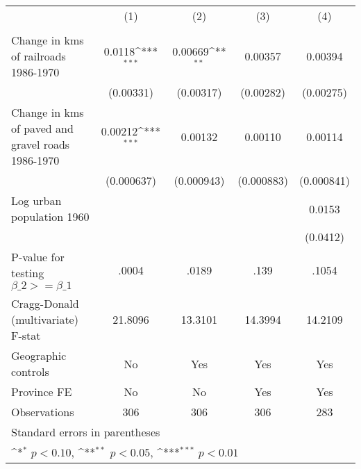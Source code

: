 {
\def\sym#1{\ifmmode^{#1}\else\(^{#1}\)\fi}
\begin{tabular}{l*{4}{c}}
\hline\hline
                &\multicolumn{1}{c}{(1)}&\multicolumn{1}{c}{(2)}&\multicolumn{1}{c}{(3)}&\multicolumn{1}{c}{(4)}\\
                &\multicolumn{1}{c}{}&\multicolumn{1}{c}{}&\multicolumn{1}{c}{}&\multicolumn{1}{c}{}\\
\hline
Change in kms of railroads 1986-1970&   0.0118\sym{***}&  0.00669\sym{**} &  0.00357         &  0.00394         \\
                &(0.00331)         &(0.00317)         &(0.00282)         &(0.00275)         \\
[1em]
Change in kms of paved and gravel roads 1986-1970&  0.00212\sym{***}&  0.00132         &  0.00110         &  0.00114         \\
                &(0.000637)         &(0.000943)         &(0.000883)         &(0.000841)         \\
[1em]
Log urban population 1960&                  &                  &                  &   0.0153         \\
                &                  &                  &                  & (0.0412)         \\
\hline
P-value for testing $\beta\_{2} >= \beta\_{1}$&    .0004         &    .0189         &     .139         &    .1054         \\
Cragg-Donald (multivariate) F-stat&  21.8096         &  13.3101         &  14.3994         &  14.2109         \\
Geographic controls&       No         &      Yes         &      Yes         &      Yes         \\
Province FE     &       No         &       No         &      Yes         &      Yes         \\
Observations    &      306         &      306         &      306         &      283         \\
\hline\hline
\multicolumn{5}{l}{\footnotesize Standard errors in parentheses}\\
\multicolumn{5}{l}{\footnotesize \sym{*} \(p<0.10\), \sym{**} \(p<0.05\), \sym{***} \(p<0.01\)}\\
\end{tabular}
}
